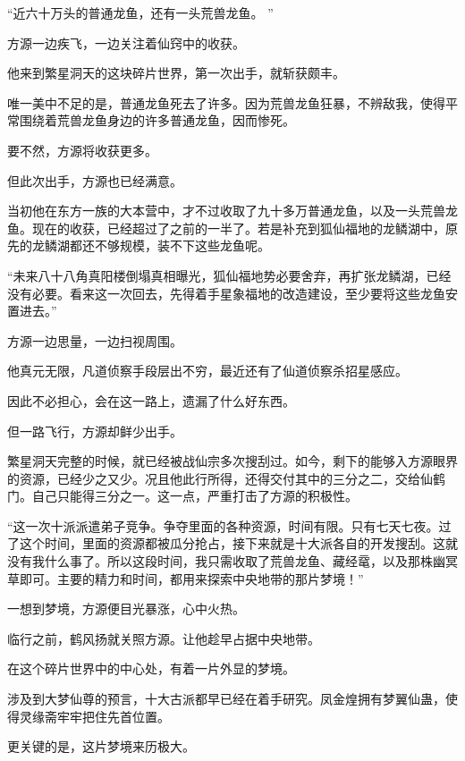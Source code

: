 
\begin{this_body}



“近六十万头的普通龙鱼，还有一头荒兽龙鱼。 ”

方源一边疾飞，一边关注着仙窍中的收获。

他来到繁星洞天的这块碎片世界，第一次出手，就斩获颇丰。

唯一美中不足的是，普通龙鱼死去了许多。因为荒兽龙鱼狂暴，不辨敌我，使得平常围绕着荒兽龙鱼身边的许多普通龙鱼，因而惨死。

要不然，方源将收获更多。

但此次出手，方源也已经满意。

当初他在东方一族的大本营中，才不过收取了九十多万普通龙鱼，以及一头荒兽龙鱼。现在的收获，已经超过了之前的一半了。若是补充到狐仙福地的龙鳞湖中，原先的龙鳞湖都还不够规模，装不下这些龙鱼呢。

“未来八十八角真阳楼倒塌真相曝光，狐仙福地势必要舍弃，再扩张龙鳞湖，已经没有必要。看来这一次回去，先得着手星象福地的改造建设，至少要将这些龙鱼安置进去。”

方源一边思量，一边扫视周围。

他真元无限，凡道侦察手段层出不穷，最近还有了仙道侦察杀招星感应。

因此不必担心，会在这一路上，遗漏了什么好东西。

但一路飞行，方源却鲜少出手。

繁星洞天完整的时候，就已经被战仙宗多次搜刮过。如今，剩下的能够入方源眼界的资源，已经少之又少。况且他此行所得，还得交付其中的三分之二，交给仙鹤门。自己只能得三分之一。这一点，严重打击了方源的积极性。

“这一次十派派遣弟子竞争。争夺里面的各种资源，时间有限。只有七天七夜。过了这个时间，里面的资源都被瓜分抢占，接下来就是十大派各自的开发搜刮。这就没有我什么事了。所以这段时间，我只需收取了荒兽龙鱼、藏经鼋，以及那株幽冥草即可。主要的精力和时间，都用来探索中央地带的那片梦境！”

一想到梦境，方源便目光暴涨，心中火热。

临行之前，鹤风扬就关照方源。让他趁早占据中央地带。

在这个碎片世界中的中心处，有着一片外显的梦境。

涉及到大梦仙尊的预言，十大古派都早已经在着手研究。凤金煌拥有梦翼仙蛊，使得灵缘斋牢牢把住先首位置。

更关键的是，这片梦境来历极大。


\end{this_body}
